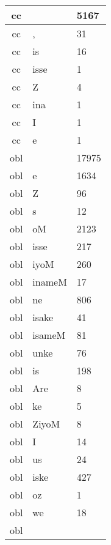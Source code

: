 \documentclass[a4 paper]{article}
\begin{document}
\begin{longtable}{cp{}p{}}
cc &  & 5167\\ \midrule cc & , & 31\\ \midrule cc & is & 16\\ \midrule cc & isse & 1\\ \midrule cc & Z & 4\\ \midrule cc & ina & 1\\ \midrule cc & I & 1\\ \midrule cc & e & 1\\ \midrule 
obl &  & 17975\\ \midrule obl & e & 1634\\ \midrule obl & Z & 96\\ \midrule obl & s & 12\\ \midrule obl & oM & 2123\\ \midrule obl & isse & 217\\ \midrule obl & iyoM & 260\\ \midrule obl & inameM & 17\\ \midrule obl & ne & 806\\ \midrule obl & isake & 41\\ \midrule obl & isameM & 81\\ \midrule obl & unke & 76\\ \midrule obl & is & 198\\ \midrule obl & Are & 8\\ \midrule obl & ke & 5\\ \midrule obl & ZiyoM & 8\\ \midrule obl & I & 14\\ \midrule obl & us & 24\\ \midrule obl & iske & 427\\ \midrule obl & oz & 1\\ \midrule obl & we & 18\\ \midrule obl 
\end{longtable}
\end{document}

